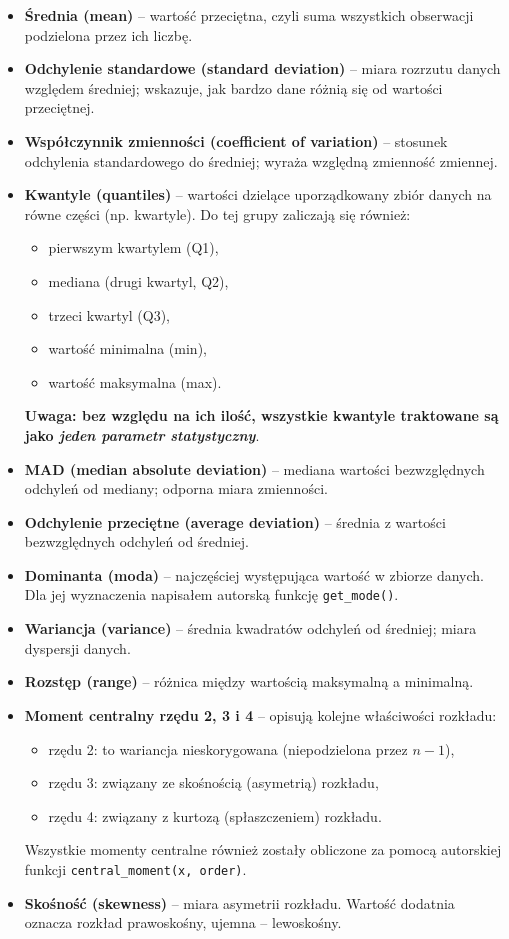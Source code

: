 \documentclass[polish]{article}
\begin{document}
    \begin{itemize}
        \item \textbf{Średnia (mean)} -- wartość przeciętna, czyli suma wszystkich obserwacji podzielona przez ich liczbę.
        \item \textbf{Odchylenie standardowe (standard deviation)} -- miara rozrzutu danych względem średniej; wskazuje, jak bardzo dane różnią się od wartości przeciętnej.
        \item \textbf{Współczynnik zmienności (coefficient of variation)} -- stosunek odchylenia standardowego do średniej; wyraża względną zmienność zmiennej.
        \item \textbf{Kwantyle (quantiles)} -- wartości dzielące uporządkowany zbiór danych na równe części (np. kwartyle). Do tej grupy zaliczają się również:
        \begin{itemize}
            \item pierwszym kwartylem (Q1),
            \item mediana (drugi kwartyl, Q2),
            \item trzeci kwartyl (Q3),
            \item wartość minimalna (min),
            \item wartość maksymalna (max).
        \end{itemize}
        \textbf{Uwaga: bez względu na ich ilość, wszystkie kwantyle traktowane są jako \textit{jeden parametr statystyczny}}.
        \item \textbf{MAD (median absolute deviation)} -- mediana wartości bezwzględnych odchyleń od mediany; odporna miara zmienności.
        \item \textbf{Odchylenie przeciętne (average deviation)} -- średnia z wartości bezwzględnych odchyleń od średniej.
        \item \textbf{Dominanta (moda)} -- najczęściej występująca wartość w zbiorze danych. Dla jej wyznaczenia napisałem autorską funkcję \texttt{get\_mode()}.
        \item \textbf{Wariancja (variance)} -- średnia kwadratów odchyleń od średniej; miara dyspersji danych.
        \item \textbf{Rozstęp (range)} -- różnica między wartością maksymalną a minimalną.
        \item \textbf{Moment centralny rzędu 2, 3 i 4} -- opisują kolejne właściwości rozkładu:
        \begin{itemize}
            \item rzędu 2: to wariancja nieskorygowana (niepodzielona przez $n-1$),
            \item rzędu 3: związany ze skośnością (asymetrią) rozkładu,
            \item rzędu 4: związany z kurtozą (spłaszczeniem) rozkładu.
        \end{itemize}
        Wszystkie momenty centralne również zostały obliczone za pomocą autorskiej funkcji \texttt{central\_moment(x, order)}.
        \item \textbf{Skośność (skewness)} -- miara asymetrii rozkładu. Wartość dodatnia oznacza rozkład prawoskośny, ujemna – lewoskośny.
    \end{itemize}
\end{document}
